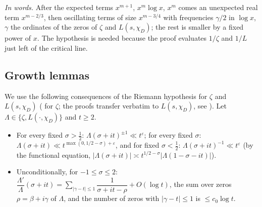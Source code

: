 \documentclass[11pt,a4paper]{article}
\theoremstyle{remark}\newtheorem{remark}[theorem]{Remark}
\begin{document}
\emph{In words.} After the expected terms $x^{m+1}$, $x^m\log x$, $x^m$ comes an unexpected real term
$x^{m-2/3}$, then oscillating terms of size $x^{m-3/4}$ with frequencies $\gamma/2$ in $\log x$, $\gamma$ the
ordinates of the zeros of $\zeta$ and $L(s,\chi_D)$; the rest is smaller by a fixed power of $x$. The
hypothesis is needed because the proof evaluates $1/\zeta$ and $1/L$ just left of the critical line.

\subsection{Growth lemmas}

We use the following consequences of the Riemann hypothesis for $\zeta$ and $L(s,\chi_D)$
(\cite[Chapter~14]{Titchmarsh1986} for $\zeta$; the proofs transfer verbatim to $L(s,\chi_D)$, see
\cite[\S5.7]{IwaniecKowalski2004}). Let $\Lambda\in\{\zeta,L(\cdot,\chi_D)\}$ and $t\ge2$.
\begin{itemize}
\item[(G1)] For every fixed $\sigma>\tfrac12$: $\Lambda(\sigma+it)^{\pm1}\ll t^{\varepsilon}$; for every fixed $\sigma$:
$\Lambda(\sigma+it)\ll t^{\max(0,1/2-\sigma)+\varepsilon}$, and for fixed $\sigma<\tfrac12$:
$\Lambda(\sigma+it)^{-1}\ll t^{\varepsilon}$ (by the functional equation, $|\Lambda(\sigma+it)|\asymp t^{1/2-\sigma}|\Lambda(1-\sigma-it)|$).
\item[(G2)] Unconditionally, for $-1\le\sigma\le2$: $\dfrac{\Lambda'}{\Lambda}(\sigma+it)=\sum_{|\gamma-t|\le1}\dfrac1{\sigma+it-\rho}+O(\log t)$,
the sum over zeros $\rho=\beta+i\gamma$ of $\Lambda$, and the number of zeros with $|\gamma-t|\le1$ is $\le c_0\log t$.
\end{itemize}
\end{document}

